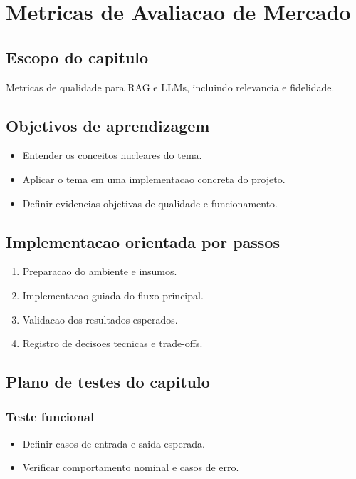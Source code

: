\chapter{Metricas de Avaliacao de Mercado}
\label{chap:avaliacao_metricas_mercado}

\section{Escopo do capitulo}
Metricas de qualidade para RAG e LLMs, incluindo relevancia e fidelidade.

\section{Objetivos de aprendizagem}
\begin{itemize}[leftmargin=*]
  \item Entender os conceitos nucleares do tema.
  \item Aplicar o tema em uma implementacao concreta do projeto.
  \item Definir evidencias objetivas de qualidade e funcionamento.
\end{itemize}

\section{Implementacao orientada por passos}
\begin{enumerate}[leftmargin=*]
  \item Preparacao do ambiente e insumos.
  \item Implementacao guiada do fluxo principal.
  \item Validacao dos resultados esperados.
  \item Registro de decisoes tecnicas e trade-offs.
\end{enumerate}

\section{Plano de testes do capitulo}
\subsection{Teste funcional}
\begin{itemize}[leftmargin=*]
  \item Definir casos de entrada e saida esperada.
  \item Verificar comportamento nominal e casos de erro.
\end{itemize}


